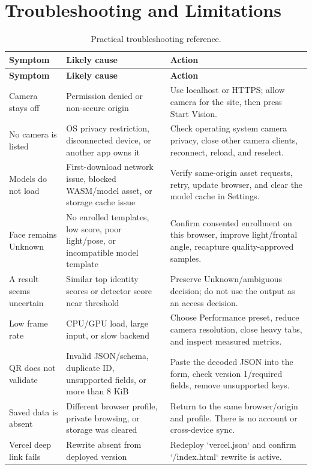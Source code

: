 \documentclass[11pt,oneside,openany]{report}
\begin{document}
\chapter{Troubleshooting and Limitations}
\begin{longtable}{>{\raggedright\arraybackslash}p{}p{}p{}}
\caption{Practical troubleshooting reference.}\label{tab:troubleshooting}\\
\toprule
\textbf{Symptom} & \textbf{Likely cause} & \textbf{Action} \\
\midrule
\endfirsthead
\toprule
\textbf{Symptom} & \textbf{Likely cause} & \textbf{Action} \\
\midrule
\endhead
Camera stays off & Permission denied or non-secure origin & Use localhost or HTTPS; allow camera for the site, then press Start Vision. \\
No camera is listed & OS privacy restriction, disconnected device, or another app owns it & Check operating system camera privacy, close other camera clients, reconnect, reload, and reselect. \\
Models do not load & First-download network issue, blocked WASM/model asset, or storage cache issue & Verify same-origin asset requests, retry, update browser, and clear the model cache in Settings. \\
Face remains Unknown & No enrolled templates, low score, poor light/pose, or incompatible model template & Confirm consented enrollment on this browser, improve light/frontal angle, recapture quality-approved samples. \\
A result seems uncertain & Similar top identity scores or detector score near threshold & Preserve Unknown/ambiguous decision; do not use the output as an access decision. \\
Low frame rate & CPU/GPU load, large input, or slow backend & Choose Performance preset, reduce camera resolution, close heavy tabs, and inspect measured metrics. \\
QR does not validate & Invalid JSON/schema, duplicate ID, unsupported fields, or more than 8 KiB & Paste the decoded JSON into the form, check version 1/required fields, remove unsupported keys. \\
Saved data is absent & Different browser profile, private browsing, or storage was cleared & Return to the same browser/origin and profile. There is no account or cross-device sync. \\
Vercel deep link fails & Rewrite absent from deployed version & Redeploy `vercel.json` and confirm `/index.html` rewrite is active. \\
\bottomrule
\end{longtable}
\end{document}
